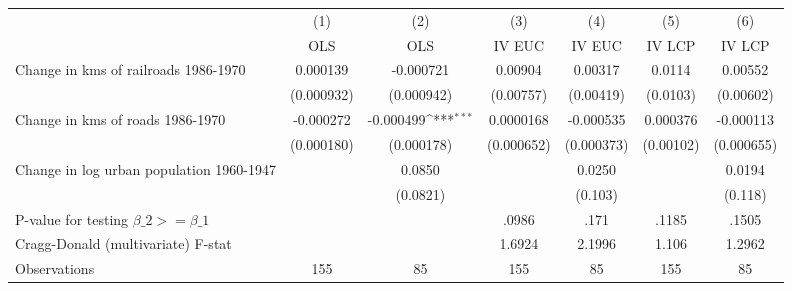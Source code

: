 {
\def\sym#1{\ifmmode^{#1}\else\(^{#1}\)\fi}
\begin{tabular}{l*{6}{c}}
\hline\hline
                &\multicolumn{1}{c}{(1)}&\multicolumn{1}{c}{(2)}&\multicolumn{1}{c}{(3)}&\multicolumn{1}{c}{(4)}&\multicolumn{1}{c}{(5)}&\multicolumn{1}{c}{(6)}\\
                &\multicolumn{1}{c}{OLS}&\multicolumn{1}{c}{OLS}&\multicolumn{1}{c}{IV EUC}&\multicolumn{1}{c}{IV EUC}&\multicolumn{1}{c}{IV LCP}&\multicolumn{1}{c}{IV LCP}\\
\hline
Change in kms of railroads 1986-1970& 0.000139         &-0.000721         &  0.00904         &  0.00317         &   0.0114         &  0.00552         \\
                &(0.000932)         &(0.000942)         &(0.00757)         &(0.00419)         & (0.0103)         &(0.00602)         \\
[1em]
Change in kms of roads 1986-1970&-0.000272         &-0.000499\sym{***}&0.0000168         &-0.000535         & 0.000376         &-0.000113         \\
                &(0.000180)         &(0.000178)         &(0.000652)         &(0.000373)         &(0.00102)         &(0.000655)         \\
[1em]
Change in log urban population 1960-1947&                  &   0.0850         &                  &   0.0250         &                  &   0.0194         \\
                &                  & (0.0821)         &                  &  (0.103)         &                  &  (0.118)         \\
\hline
P-value for testing $\beta\_{2} >= \beta\_{1}$&                  &                  &    .0986         &     .171         &    .1185         &    .1505         \\
Cragg-Donald (multivariate) F-stat&                  &                  &   1.6924         &   2.1996         &    1.106         &   1.2962         \\
Observations    &      155         &       85         &      155         &       85         &      155         &       85         \\
\hline\hline
\end{tabular}
}
